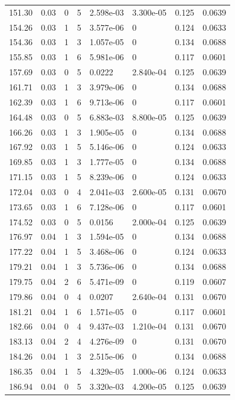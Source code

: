 \documentclass[preview]{standalone}
\begin{document}
{{{\begin{tabular}{L{1.2cm}C{1.2cm} C{0.3cm}C{0.5cm} C{1.4cm}C{1.4cm} C{1.4cm}C{1.4cm}}
  151.30  &  0.03  & 0     &  5 &  2.598e-03  & 3.300e-05  & 0.125 &  0.0639   \\ 
  154.26  &  0.03  & 1     &  5 &  3.577e-06  & 0  & 0.124 &  0.0633   \\ 
  154.36  &  0.03  & 1     &  3 &  1.057e-05  & 0  & 0.134 &  0.0688   \\ 
  155.85  &  0.03  & 1     &  6 &  5.981e-06  & 0  & 0.117 &  0.0601   \\ 
  157.69  &  0.03  & 0     &  5 &  0.0222  & 2.840e-04  & 0.125 &  0.0639   \\ 
  161.71  &  0.03  & 1     &  3 &  3.979e-06  & 0  & 0.134 &  0.0688   \\ 
  162.39  &  0.03  & 1     &  6 &  9.713e-06  & 0  & 0.117 &  0.0601   \\ 
  164.48  &  0.03  & 0     &  5 &  6.883e-03  & 8.800e-05  & 0.125 &  0.0639   \\ 
  166.26  &  0.03  & 1     &  3 &  1.905e-05  & 0  & 0.134 &  0.0688   \\ 
  167.92  &  0.03  & 1     &  5 &  5.146e-06  & 0  & 0.124 &  0.0633   \\ 
  169.85  &  0.03  & 1     &  3 &  1.777e-05  & 0  & 0.134 &  0.0688   \\ 
  171.15  &  0.03  & 1     &  5 &  8.239e-06  & 0  & 0.124 &  0.0633   \\ 
  172.04  &  0.03  & 0     &  4 &  2.041e-03  & 2.600e-05  & 0.131 &  0.0670   \\ 
  173.65  &  0.03  & 1     &  6 &  7.128e-06  & 0  & 0.117 &  0.0601   \\ 
  174.52  &  0.03  & 0     &  5 &  0.0156  & 2.000e-04  & 0.125 &  0.0639   \\ 
  176.97  &  0.04  & 1     &  3 &  1.594e-05  & 0  & 0.134 &  0.0688   \\ 
  177.22  &  0.04  & 1     &  5 &  3.468e-06  & 0  & 0.124 &  0.0633   \\ 
  179.21  &  0.04  & 1     &  3 &  5.736e-06  & 0  & 0.134 &  0.0688   \\ 
  179.75  &  0.04  & 2     &  6 &  5.471e-09  & 0  & 0.119 &  0.0607   \\ 
  179.86  &  0.04  & 0     &  4 &  0.0207  & 2.640e-04  & 0.131 &  0.0670   \\ 
  181.21  &  0.04  & 1     &  6 &  1.571e-05  & 0  & 0.117 &  0.0601   \\ 
  182.66  &  0.04  & 0     &  4 &  9.437e-03  & 1.210e-04  & 0.131 &  0.0670   \\ 
  183.13  &  0.04  & 2     &  4 &  4.276e-09  & 0  & 0.131 &  0.0670   \\ 
  184.26  &  0.04  & 1     &  3 &  2.515e-06  & 0  & 0.134 &  0.0688   \\ 
  186.35  &  0.04  & 1     &  5 &  4.329e-05  & 1.000e-06  & 0.124 &  0.0633   \\ 
  186.94  &  0.04  & 0     &  5 &  3.320e-03  & 4.200e-05  & 0.125 &  0.0639   \\ 
\hline 
\end{tabular} 

}}}
\end{document}
